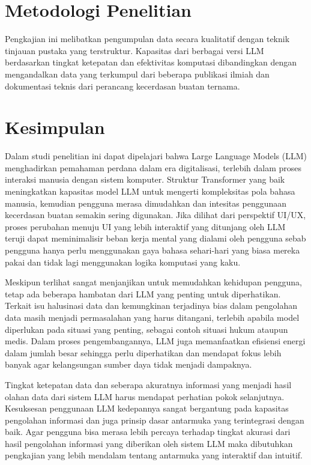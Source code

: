 \documentclass[conference]{IEEEtran}
\begin{document}
\section{Metodologi Penelitian}

Pengkajian ini melibatkan pengumpulan data secara kualitatif dengan teknik tinjauan pustaka yang terstruktur. Kapasitas dari berbagai versi LLM berdasarkan tingkat ketepatan dan efektivitas komputasi dibandingkan dengan mengandalkan data yang terkumpul dari beberapa publikasi ilmiah dan dokumentasi teknis dari perancang kecerdasan buatan ternama.

\section{Kesimpulan}

Dalam studi penelitian ini dapat dipelajari bahwa Large Language Models (LLM) menghadirkan pemahaman perdana dalam era digitalisasi, terlebih dalam proses interaksi manusia dengan sistem komputer. Struktur Transformer yang baik meningkatkan kapasitas model LLM untuk mengerti kompleksitas pola bahasa manusia, kemudian pengguna merasa dimudahkan dan intesitas penggunaan kecerdasan buatan semakin sering digunakan. Jika dilihat dari perspektif UI/UX, proses perubahan menuju UI yang lebih interaktif yang ditunjang oleh LLM teruji dapat meminimalisir beban kerja mental yang dialami oleh pengguna sebab pengguna hanya perlu menggunakan gaya bahasa sehari-hari yang biasa mereka pakai dan tidak lagi menggunakan logika komputasi yang kaku.

Meskipun terlihat sangat menjanjikan untuk memudahkan kehidupan pengguna, tetap ada beberapa hambatan dari LLM yang penting untuk diperhatikan. Terkait isu halusinasi data dan kemungkinan terjadinya bias dalam pengolahan data masih menjadi permasalahan yang harus ditangani, terlebih apabila model diperlukan pada situasi yang penting, sebagai contoh situasi hukum ataupun medis. Dalam proses pengembangannya, LLM juga memanfaatkan efisiensi energi dalam jumlah besar sehingga perlu diperhatikan dan mendapat fokus lebih banyak agar kelangsungan sumber daya tidak menjadi dampaknya.

Tingkat ketepatan data dan seberapa akuratnya informasi  yang menjadi hasil olahan data dari sistem LLM harus mendapat perhatian pokok selanjutnya. Kesuksesan penggunaan LLM kedepannya sangat bergantung pada kapasitas pengolahan informasi dan juga prinsip dasar antarmuka yang terintegrasi dengan baik. 
Agar pengguna bisa merasa lebih percaya terhadap tingkat akurasi dari hasil pengolahan informasi yang diberikan oleh sistem LLM maka dibutuhkan pengkajian yang lebih mendalam tentang antarmuka yang interaktif dan intuitif.
\end{document}
